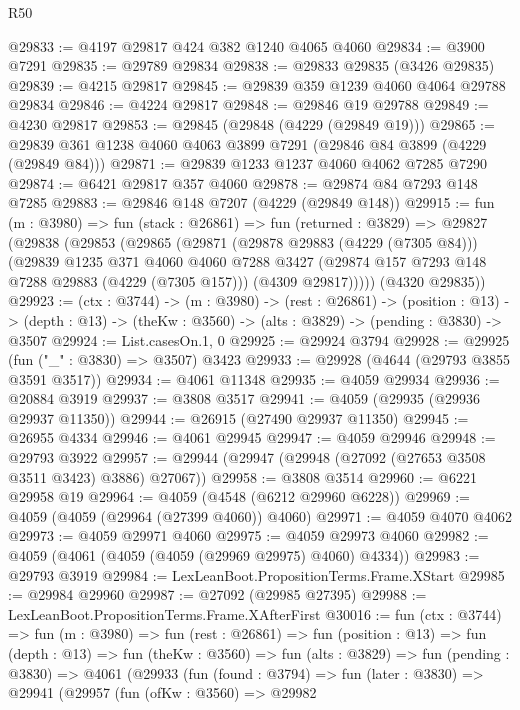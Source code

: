 \begin{lexlean}{R50}
\begin{coremodule}
@29833 := @4197 @29817 @424 @382 @1240 @4065 @4060
@29834 := @3900 @7291
@29835 := @29789 @29834
@29838 := @29833 @29835 (@3426 @29835)
@29839 := @4215 @29817
@29845 := @29839 @359 @1239 @4060 @4064 @29788 @29834
@29846 := @4224 @29817
@29848 := @29846 @19 @29788
@29849 := @4230 @29817
@29853 := @29845 (@29848 (@4229 (@29849 @19)))
@29865 := @29839 @361 @1238 @4060 @4063 @3899 @7291 (@29846 @84 @3899 (@4229 (@29849 @84)))
@29871 := @29839 @1233 @1237 @4060 @4062 @7285 @7290
@29874 := @6421 @29817 @357 @4060
@29878 := @29874 @84 @7293 @148 @7285
@29883 := @29846 @148 @7207 (@4229 (@29849 @148))
@29915 := fun (m : @3980) =>
  fun (stack : @26861) =>
  fun (returned : @3829) =>
  @29827
    (@29838
      (@29853
        (@29865
          (@29871
            (@29878 @29883 (@4229 (@7305 @84)))
            (@29839
              @1235
              @371
              @4060
              @4060
              @7288
              @3427
              (@29874 @157 @7293 @148 @7288 @29883 (@4229 (@7305 @157)))
              (@4309 @29817)))))
      (@4320 @29835))
@29923 := (ctx : @3744) ->
  (m : @3980) ->
  (rest : @26861) ->
  (position : @13) ->
  (depth : @13) -> (theKw : @3560) -> (alts : @3829) -> (pending : @3830) -> @3507
@29924 := List.casesOn.{1, 0}
@29925 := @29924 @3794
@29928 := @29925 (fun ("_" : @3830) => @3507) @3423
@29933 := @29928 (@4644 (@29793 @3855 @3591 @3517))
@29934 := @4061 @11348
@29935 := @4059 @29934
@29936 := @20884 @3919
@29937 := @3808 @3517
@29941 := @4059 (@29935 (@29936 @29937 @11350))
@29944 := @26915 (@27490 @29937 @11350)
@29945 := @26955 @4334
@29946 := @4061 @29945
@29947 := @4059 @29946
@29948 := @29793 @3922
@29957 := @29944 (@29947 (@29948 (@27092 (@27653 @3508 @3511 @3423) @3886) @27067))
@29958 := @3808 @3514
@29960 := @6221 @29958 @19
@29964 := @4059 (@4548 (@6212 @29960 @6228))
@29969 := @4059 (@4059 (@29964 (@27399 @4060)) @4060)
@29971 := @4059 @4070 @4062
@29973 := @4059 @29971 @4060
@29975 := @4059 @29973 @4060
@29982 := @4059 (@4061 (@4059 (@4059 (@29969 @29975) @4060) @4334))
@29983 := @29793 @3919
@29984 := LexLeanBoot.PropositionTerms.Frame.XStart
@29985 := @29984 @29960
@29987 := @27092 (@29985 @27395)
@29988 := LexLeanBoot.PropositionTerms.Frame.XAfterFirst
@30016 := fun (ctx : @3744) =>
  fun (m : @3980) =>
  fun (rest : @26861) =>
  fun (position : @13) =>
  fun (depth : @13) =>
  fun (theKw : @3560) =>
  fun (alts : @3829) =>
  fun (pending : @3830) =>
  @4061
    (@29933
      (fun (found : @3794) =>
      fun (later : @3830) =>
      @29941
        (@29957
          (fun (ofKw : @3560) =>
          @29982

\end{coremodule}
\end{lexlean}
